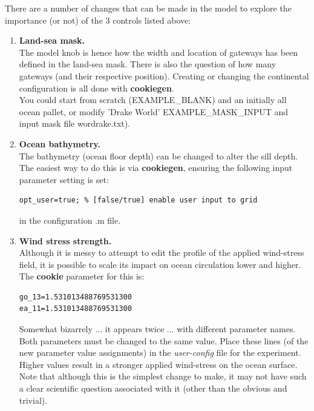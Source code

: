 \newpage

\noindent There are a number of changes that can be made in the model to explore the importance (or not) of the 3 controls listed above:
\vspace{1mm}

\begin{enumerate}
\vspace{1mm}
\item \textbf{Land-sea mask.}
\vspace{1mm}
\\The model knob is hence how the width and location of gateways has been defined in the land-sea mask. There is also the question of how many gateways (and their respective position). Creating or changing the continental configuration is all done with \textbf{cookiegen}.
\\You could start from scratch (\textsf{\footnotesize EXAMPLE\_BLANK}) and an initially all ocean pallet, or modify 'Drake World' \textsf{\footnotesize EXAMPLE\_MASK\_INPUT} and input mask file \textsf{\footnotesize wordrake.txt}).
\vspace{1mm}
\item \textbf{Ocean bathymetry.}
\vspace{1mm}
\\The bathymetry (ocean floor depth) can be changed to alter the sill depth. The easiest way to do this is via \textbf{cookiegen}, ensuring the following input parameter setting is set:
\vspace{-1mm}\small\begin{verbatim}
opt_user=true; % [false/true] enable user input to grid
\end{verbatim}\normalsize\vspace{-1mm}
in the configuration \textsf{\footnotesize .m} file.
\vspace{1mm}
\item \textbf{Wind stress strength.}
\vspace{1mm}
\\Although it is messy to attempt to edit the profile of the applied wind-stress field, it is possible to scale its impact on ocean circulation lower and higher. The \textbf{cookie} parameter for this is:
\vspace{-1mm}\small\begin{verbatim}
go_13=1.531013488769531300
ea_11=1.531013488769531300
\end{verbatim}\normalsize\vspace{-1mm}
Somewhat bizarrely ... it appears twice ... with different parameter names. Both parameters must be changed to the same value. Place these lines (of the new parameter value assignments) in the \textit{user-config} file for the experiment. Higher values result in a stronger applied wind-stress on the ocean surface.
\vspace{1mm}
\\Note that although this is the simplest change to make, it may not have such a clear scientific question associated with it (other than the obvious and trivial).
\end{enumerate}

